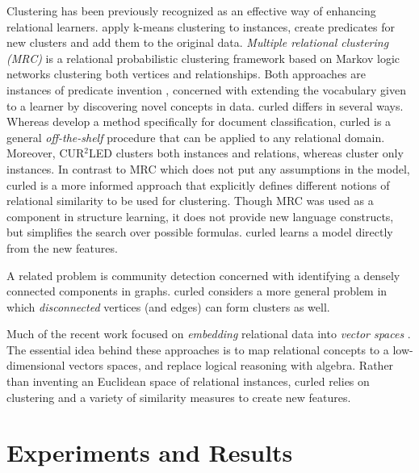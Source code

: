 Clustering has been previously recognized as an effective way of enhancing relational learners.
\cite{Popescul2004}  apply k-means clustering to instances, create predicates for new clusters and add them to the original data.
\textit{Multiple relational clustering (MRC)} \cite{Kok2007,Kok2008} is a relational probabilistic clustering framework based on Markov logic networks \cite{Richardson2006} clustering both vertices and relationships. 
Both approaches are instances of predicate invention \cite{Kramer1995,Craven2001}, concerned with extending the vocabulary given to a learner by discovering novel concepts in data.
\gls{curled} differs in several ways.
Whereas \cite{Popescul2004} develop a method specifically  for document classification, \gls{curled} is a general \textit{off-the-shelf} procedure that can be applied to any relational domain.
Moreover, CUR$^2$LED clusters both instances and relations, whereas \cite{Popescul2004} cluster only instances.
In contrast to MRC which does not put any assumptions in the model, \gls{curled} is a more informed approach that explicitly defines different notions of relational similarity to be used for clustering.
Though MRC was used as a component in structure learning, it does not provide new language constructs, but simplifies the search over possible formulas.
\gls{curled} learns a model directly from the new features.


A related problem is community detection \cite{Karypis:1998:FHQ:305219.305248,Fortunato201075} concerned with identifying a densely connected components in graphs.
\gls{curled} considers a more general problem in which \textit{disconnected} vertices (and edges) can form clusters as well.


Much of the recent work focused on  \textit{embedding} relational data into \textit{vector spaces} \cite{Nickel0TG16,DBLP:conf/nips/Niepert16,Bordes:2011:LSE,Bordes:2013:TEM,DBLP:conf/icml/NiepertAK16}.
The essential idea behind these approaches is to map relational concepts to a low-dimensional vectors spaces, and replace logical reasoning with algebra.
Rather than inventing an Euclidean space of relational instances, \gls{curled} relies on clustering and a variety of similarity measures to create new features.


\section{Experiments and Results}
\label{sec:Results}




